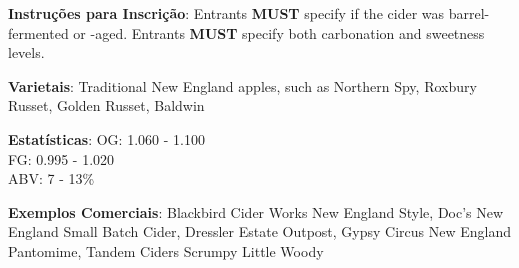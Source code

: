 \textbf{Instruções para Inscrição}: Entrants \textbf{MUST} specify if the cider was barrel-fermented or -aged. Entrants \textbf{MUST} specify both carbonation and sweetness levels.

\textbf{Varietais}: Traditional New England apples, such as Northern Spy, Roxbury Russet, Golden Russet, Baldwin

\textbf{Estatísticas}: OG: 1.060 - 1.100 \\
\phantom{ } \hspace{16.5mm} FG: 0.995 - 1.020 \\
\phantom{ } \hspace{16.5mm} ABV: 7 - 13\%

\textbf{Exemplos Comerciais}: Blackbird Cider Works New England Style, Doc’s New England Small Batch Cider, Dressler Estate Outpost, Gypsy Circus New England Pantomime, Tandem Ciders Scrumpy Little Woody
